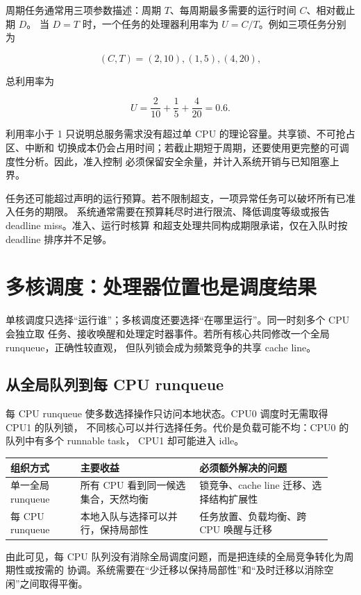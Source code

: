 周期任务通常用三项参数描述：周期 $T$、每周期最多需要的运行时间 $C$、相对截止期 $D$。
当 $D=T$ 时，一个任务的处理器利用率为 $U=C/T$。例如三项任务分别为

\[
(C,T)=(2,10),(1,5),(4,20),
\]

总利用率为

\[
U=\frac{2}{10}+\frac{1}{5}+\frac{4}{20}=0.6.
\]

利用率小于 1 只说明总服务需求没有超过单 CPU 的理论容量。共享锁、不可抢占区、中断和
切换成本仍会占用时间；若截止期短于周期，还要使用更完整的可调度性分析。因此，准入控制
必须保留安全余量，并计入系统开销与已知阻塞上界。

任务还可能超过声明的运行预算。若不限制超支，一项异常任务可以破坏所有已准入任务的期限。
系统通常需要在预算耗尽时进行限流、降低调度等级或报告 deadline miss。准入、运行时核算
和超支处理共同构成期限承诺，仅在入队时按 deadline 排序并不足够。

\section{多核调度：处理器位置也是调度结果}

单核调度只选择“运行谁”；多核调度还要选择“在哪里运行”。同一时刻多个 CPU 会独立取
任务、接收唤醒和处理定时器事件。若所有核心共同修改一个全局 runqueue，正确性较直观，
但队列锁会成为频繁竞争的共享 cache line。

\subsection{从全局队列到每 CPU runqueue}

每 CPU runqueue 使多数选择操作只访问本地状态。CPU0 调度时无需取得 CPU1 的队列锁，
不同核心可以并行选择任务。代价是负载可能不均：CPU0 的队列中有多个 runnable task，
CPU1 却可能进入 idle。

\begin{longtable}{|L{0.2\linewidth}|L{0.34\linewidth}|L{0.38\linewidth}|}
\toprule
组织方式 & 主要收益 & 必须额外解决的问题 \\
\midrule
单一全局 runqueue & 所有 CPU 看到同一候选集合，天然均衡 & 锁竞争、cache line 迁移、选择结构扩展性 \\\tablerowrule
每 CPU runqueue & 本地入队与选择可以并行，保持局部性 & 任务放置、负载均衡、跨 CPU 唤醒与迁移 \\
\bottomrule
\end{longtable}

由此可见，每 CPU 队列没有消除全局调度问题，而是把连续的全局竞争转化为周期性或按需的
协调。系统需要在“少迁移以保持局部性”和“及时迁移以消除空闲”之间取得平衡。

